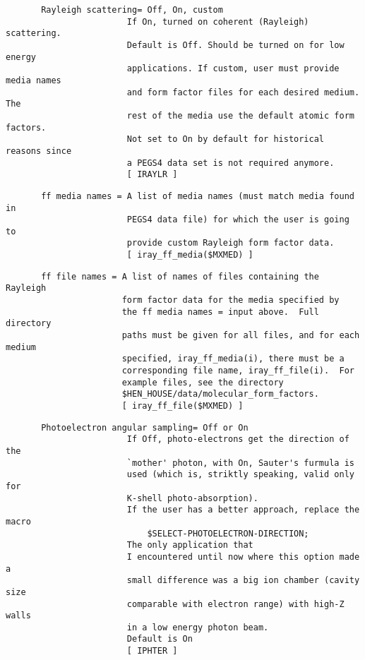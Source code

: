 \begin{verbatim}
       Rayleigh scattering= Off, On, custom
                        If On, turned on coherent (Rayleigh) scattering.
                        Default is Off. Should be turned on for low energy
                        applications. If custom, user must provide media names
                        and form factor files for each desired medium. The
                        rest of the media use the default atomic form factors.
                        Not set to On by default for historical reasons since
                        a PEGS4 data set is not required anymore.
                        [ IRAYLR ]
\end{verbatim}
\begin{verbatim}
       ff media names = A list of media names (must match media found in
                        PEGS4 data file) for which the user is going to
                        provide custom Rayleigh form factor data.
                        [ iray_ff_media($MXMED) ]
\end{verbatim}
\begin{verbatim}
       ff file names = A list of names of files containing the Rayleigh
                       form factor data for the media specified by
                       the ff media names = input above.  Full directory
                       paths must be given for all files, and for each medium
                       specified, iray_ff_media(i), there must be a
                       corresponding file name, iray_ff_file(i).  For
                       example files, see the directory
                       $HEN_HOUSE/data/molecular_form_factors.
                       [ iray_ff_file($MXMED) ]
\end{verbatim}
\begin{verbatim}
       Photoelectron angular sampling= Off or On
                        If Off, photo-electrons get the direction of the
                        `mother' photon, with On, Sauter's furmula is
                        used (which is, striktly speaking, valid only for
                        K-shell photo-absorption).
                        If the user has a better approach, replace the macro
                            $SELECT-PHOTOELECTRON-DIRECTION;
                        The only application that
                        I encountered until now where this option made a
                        small difference was a big ion chamber (cavity size
                        comparable with electron range) with high-Z walls
                        in a low energy photon beam.
                        Default is On
                        [ IPHTER ]
\end{verbatim}
